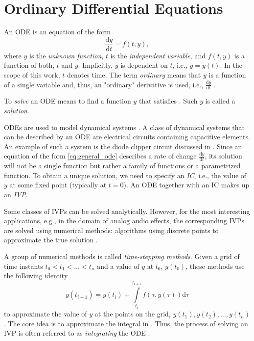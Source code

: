 \section{Ordinary Differential Equations}
\label{section:ode}

An \acf{ODE} is an equation of the form
\begin{equation}
  \frac{\mathrm{d} y}{\mathrm{d} t} = f(t, y),
  \label{eq:general_ode}
\end{equation}
where $y$ is the \emph{unknown function}, $t$ is the \emph{independent variable}, and $f(t, y)$ is a function of both, $t$ and $y$. Implicitly, $y$ is dependent on $t$, i.e., $y = y(t)$. In the scope of this work, $t$ denotes time. The term \emph{ordinary} means that $y$ is a function of a single variable and, thus, an "ordinary" derivative is used, i.e., $\frac{\mathrm{d} y}{\mathrm{d} t}$ \cite{Gockenbach2011}.

To \emph{solve} an \ac{ODE} means to find a function $y$ that satisfies . Such $y$ is called a \emph{solution}.

\acp{ODE} are used to model dynamical systems \cite{Scheinerman1996,Karlsson2019}. A class of dynamical systems that can be described by an \ac{ODE} are electrical circuits containing capacitive elements. An example of such a system is the diode clipper circuit \cite{Yeh2007} discussed in .
Since an equation of the form \eqref{eq:general_ode} describes a rate of change $\frac{\mathrm{d} y}{\mathrm{d} t}$, its solution will not be a single function but rather a family of functions or a parametrized function. To obtain a unique solution, we need to specify an \emph{\ac{IC}}, i.e., the value of $y$ at some fixed point (typically at $t=0$). An \ac{ODE} together with an \acl{IC} makes up an \emph{\ac{IVP}}.

Some classes of \acp{IVP} can be solved analytically. However, for the most interesting applications, e.g., in the domain of analog audio effects, the corresponding \acp{IVP} are solved using numerical methods: algorithms using discrete points to approximate the true solution \cite{Gockenbach2011}. 

A group of numerical methods is called \emph{time-stepping methods}. Given a grid of time instants $t_0 < t_1 < \dots < t_n$ and a value of $y$ at $t_0$, $y(t_0)$, these methods use the following identity
\begin{equation}
  y(t_{i+1}) = y(t_{i}) + \int \limits_{t_i}^{t_{i+1}} f(\tau, y(\tau)) \mathrm{d} \tau
  \label{eq:time_stepping_identity}
\end{equation}
to approximate the value of $y$ at the points on the grid, $y(t_1), y(t_2), \dots, y(t_n)$. The core idea is to approximate the integral in . Thus, the process of solving an \ac{IVP} is often referred to as \emph{integrating} the \ac{ODE} \cite{Gockenbach2011}.

